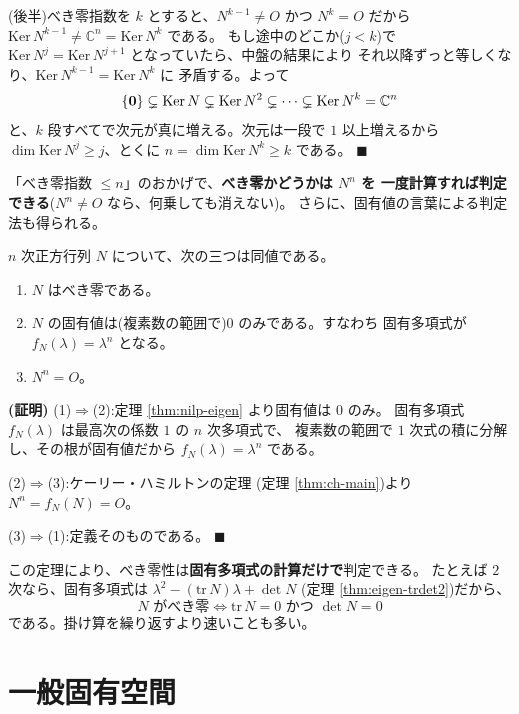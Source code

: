 (後半)べき零指数を $k$ とすると、$N^{k-1} \neq O$ かつ $N^k = O$ だから
$\mathrm{Ker}\,N^{k-1} \neq \mathbb{C}^n = \mathrm{Ker}\,N^k$ である。
もし途中のどこか($j < k$)で
$\mathrm{Ker}\,N^j = \mathrm{Ker}\,N^{j+1}$ となっていたら、中盤の結果により
それ以降ずっと等しくなり、$\mathrm{Ker}\,N^{k-1} = \mathrm{Ker}\,N^k$ に
矛盾する。よって
\[
\{\bm{0}\} \subsetneq \mathrm{Ker}\,N \subsetneq \mathrm{Ker}\,N^2
\subsetneq \cdots \subsetneq \mathrm{Ker}\,N^k = \mathbb{C}^n
\]
と、$k$ 段すべてで次元が真に増える。次元は一段で $1$ 以上増えるから
$\dim \mathrm{Ker}\,N^j \ge j$、とくに $n = \dim \mathrm{Ker}\,N^k \ge k$ である。
$\blacksquare$

「べき零指数 $\le n$」のおかげで、\textbf{べき零かどうかは $N^n$ を
一度計算すれば判定できる}($N^n \neq O$ なら、何乗しても消えない)。
さらに、固有値の言葉による判定法も得られる。

\begin{teiri}[べき零性の特徴づけ]\label{thm:nilp-char}
$n$ 次正方行列 $N$ について、次の三つは同値である。
\begin{enumerate}
\item $N$ はべき零である。
\item $N$ の固有値は(複素数の範囲で)$0$ のみである。すなわち
固有多項式が $f_N(\lambda) = \lambda^n$ となる。
\item $N^n = O$。
\end{enumerate}
\end{teiri}

\noindent\textbf{(証明)}\quad
(1)$\Rightarrow$(2):定理 \ref{thm:nilp-eigen} より固有値は $0$ のみ。
固有多項式 $f_N(\lambda)$ は最高次の係数 $1$ の $n$ 次多項式で、
複素数の範囲で $1$ 次式の積に分解し、その根が固有値だから
$f_N(\lambda) = \lambda^n$ である。

(2)$\Rightarrow$(3):ケーリー・ハミルトンの定理
(定理 \ref{thm:ch-main})より $N^n = f_N(N) = O$。

(3)$\Rightarrow$(1):定義そのものである。 $\blacksquare$

\begin{chui}
この定理により、べき零性は\textbf{固有多項式の計算だけで}判定できる。
たとえば $2$ 次なら、固有多項式は
$\lambda^2 - (\mathrm{tr}\,N)\lambda + \det N$
(定理 \ref{thm:eigen-trdet2})だから、
\[
N \text{ がべき零} \iff \mathrm{tr}\,N = 0 \text{ かつ } \det N = 0
\]
である。掛け算を繰り返すより速いことも多い。
\end{chui}

\section{一般固有空間}

